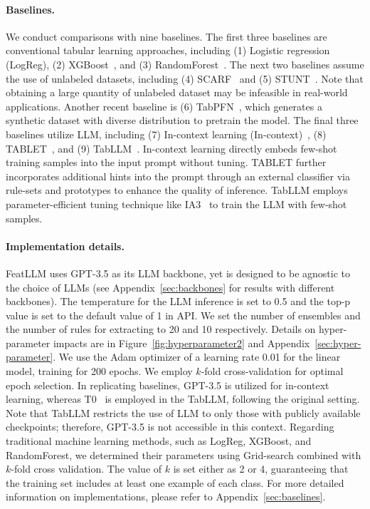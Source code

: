 \vspace*{-0.12in}
\paragraph{Baselines.}
We conduct comparisons with nine baselines. The first three baselines are conventional tabular learning approaches, including (1) Logistic regression (LogReg), (2) XGBoost~\cite{chen2016xgboost}, and (3) RandomForest~\cite{ho1995random}. The next two baselines assume the use of unlabeled datasets, including (4) SCARF~\cite{bahri2022scarf} and (5) STUNT~\cite{nam2023stunt}. Note that obtaining a large quantity of unlabeled dataset may be infeasible in real-world applications. Another recent baseline is (6) TabPFN~\cite{hollmann2022tabpfn}, which generates a synthetic dataset with diverse distribution to pretrain the model. The final three baselines utilize LLM, including (7) In-context learning (In-context)~\cite{wei2022emergent}, (8) TABLET~\cite{slack2023tablet}, and (9) TabLLM~\cite{hegselmann2023tabllm}. In-context learning directly embeds few-shot training samples into the input prompt without tuning. TABLET further incorporates additional hints into the prompt through an external classifier via rule-sets and prototypes to enhance the quality of inference. TabLLM employs parameter-efficient tuning technique like IA3~\cite{liu2022few} to train the LLM with few-shot samples. 

\vspace*{-0.12in}
\paragraph{Implementation details.}
\textsf{FeatLLM} uses GPT-3.5 as its LLM backbone, yet is designed to be agnostic to the choice of LLMs (see Appendix~\ref{sec:backbones} for results with different backbones). The temperature for the LLM inference is set to 0.5 and the top-p value is set to the default value of 1 in API. We set the number of ensembles and the number of rules for extracting to 20 and 10 respectively. Details on hyper-parameter impacts are in Figure~\ref{fig:hyperparameter2} and Appendix~\ref{sec:hyper-parameter}.
We use the Adam optimizer of a learning rate 0.01 for the linear model, training for 200 epochs. We employ $k$-fold cross-validation for optimal epoch selection. In replicating baselines, GPT-3.5 is utilized for in-context learning, whereas T0~\cite{sanh2022multitask} is employed in the TabLLM, following the original setting. Note that TabLLM restricts the use of LLM to only those with publicly available checkpoints; therefore, GPT-3.5 is not accessible in this context. Regarding traditional machine learning methods, such as LogReg, XGBoost, and RandomForest, we determined their parameters using Grid-search combined with $k$-fold cross validation. The value of $k$ is set either as 2 or 4, guaranteeing that the training set includes at least one example of each class. For more detailed information on implementations, please refer to Appendix~\ref{sec:baselines}.

